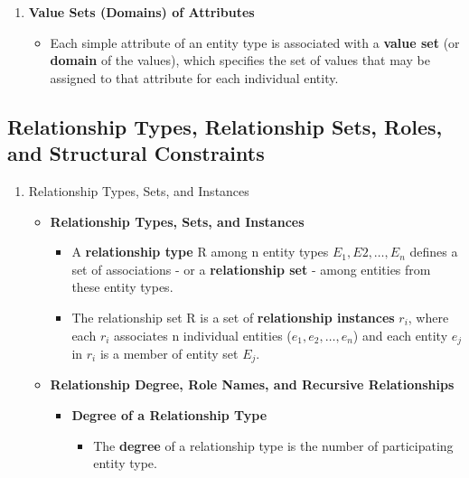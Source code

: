 \documentclass[10pt]{article}
\newcommand{\tf}{\textbf}
\begin{document}
\begin{enumerate}
	\item \tf{Value Sets (Domains) of Attributes}
	\begin{itemize}
		\item Each simple attribute of an entity type is associated with a \tf{value set} (or \tf{domain} of the values), which specifies the set of values that may be assigned to that attribute for each individual entity. 
	\end{itemize}	
\end{enumerate}

\subsection{Relationship Types, Relationship Sets, Roles, and Structural Constraints}
\begin{enumerate}
	\item Relationship Types, Sets, and Instances
	\begin{itemize}
		\item \tf{Relationship Types, Sets, and Instances}
		\begin{itemize}
			\item A \tf{relationship type} R among n entity types $E_{1}, E{2}, \ldots, E_{n}$ defines a set of associations - or a \tf{relationship set} - among entities from these entity types.
			\item The relationship set R is a set of \tf{relationship instances} $r_{i}$, where each $r_{i}$ associates n individual entities ($e_{1}, e_{2}, \ldots, e_{n}$) and each entity $e_{j}$ in $r_i$ is a member of entity set $E_{j}$.
		\end{itemize}

		\item \tf{Relationship Degree, Role Names, and Recursive Relationships}
		\begin{itemize}
			\item \tf{Degree of a Relationship Type}
			\begin{itemize}
				\item The \tf{degree} of a relationship type is the number of participating entity type.
			\end{itemize}


\end{itemize}
\end{itemize}
\end{enumerate}
\end{document}
